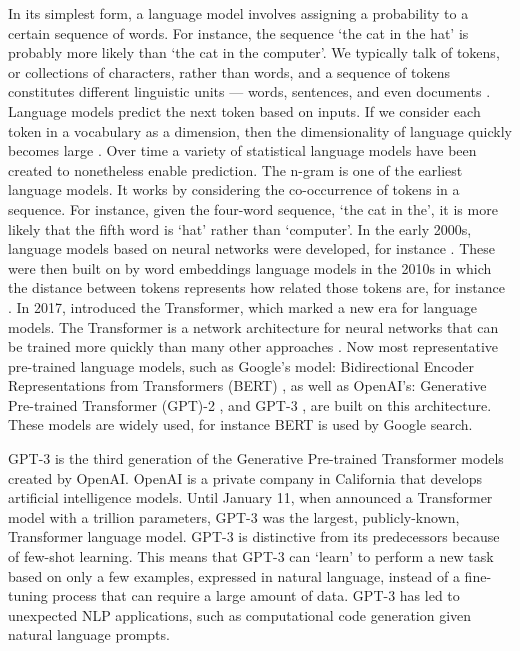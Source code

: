 \documentclass{bmcart}
\begin{document}
In its simplest form, a language model involves assigning a probability to a certain sequence of words. For instance, the sequence `the cat in the hat' is probably more likely than `the cat in the computer'. We typically talk of tokens, or collections of characters, rather than words, and a sequence of tokens constitutes different linguistic units --- words, sentences, and even documents \cite{bengio2003neural}. Language models predict the next token based on inputs. If we consider each token in a vocabulary as a dimension, then the dimensionality of language quickly becomes large \cite{rosenfeld2000two}. Over time a variety of statistical language models have been created to nonetheless enable prediction. The n-gram is one of the earliest language models. It works by considering the co-occurrence of tokens in a sequence. For instance, given the four-word sequence, `the cat in the', it is more likely that the fifth word is `hat' rather than `computer'. In the early 2000s, language models based on neural networks were developed, for instance \cite{bengio2003neural}. These were then built on by word embeddings language models in the 2010s in which the distance between tokens represents how related those tokens are, for instance \cite{turian2010word}. In 2017, \cite{vaswani2017attention} introduced the Transformer, which marked a new era for language models. The Transformer is a network architecture for neural networks that can be trained more quickly than many other approaches \cite{vaswani2017attention}. Now most representative pre-trained language models, such as Google's model: Bidirectional Encoder Representations from Transformers (BERT) \cite{devlin2018bert}, as well as OpenAI's: Generative Pre-trained Transformer (GPT)-2 \cite{radford2019language}, and GPT-3 \cite{brown2020language}, are built on this architecture. These models are widely used, for instance BERT is used by Google search.

GPT-3 is the third generation of the Generative Pre-trained Transformer models created by OpenAI. OpenAI is a private company in California that develops artificial intelligence models. Until January 11, when \cite{fedus2021switch} announced a Transformer model with a trillion parameters, GPT-3 was the largest, publicly-known, Transformer language model. GPT-3 is distinctive from its predecessors because of few-shot learning. This means that GPT-3 can `learn' to perform a new task based on only a few examples, expressed in natural language, instead of a fine-tuning process that can require a large amount of data. GPT-3 has led to unexpected NLP applications, such as computational code generation given natural language prompts.
\end{document}
